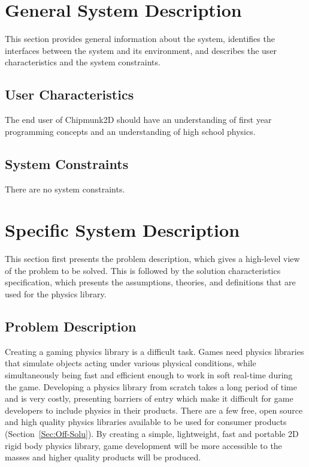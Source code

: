 \documentclass[12pt]{article}
\begin{document}
\section{General System Description}
\label{Sec:GeneSystDesc}
This section provides general information about the system, identifies the interfaces between the system and its environment, and describes the user characteristics and the system constraints.
\subsection{User Characteristics}
\label{Sec:UserChar}
The end user of Chipmunk2D should have an understanding of first year programming concepts and an understanding of high school physics.
\subsection{System Constraints}
\label{Sec:SystCons}
There are no system constraints.
\section{Specific System Description}
\label{Sec:SpecSystDesc}
This section first presents the problem description, which gives a high-level view of the problem to be solved. This is followed by the solution characteristics specification, which presents the assumptions, theories, and definitions that are used for the physics library.
\subsection{Problem Description}
\label{Sec:ProbDesc}
Creating a gaming physics library is a difficult task. Games need physics libraries that simulate objects acting under various physical conditions, while simultaneously being fast and efficient enough to work in soft real-time during the game. Developing a physics library from scratch takes a long period of time and is very costly, presenting barriers of entry which make it difficult for game developers to include physics in their products. There are a few free, open source and high quality physics libraries available to be used for consumer products (Section~\ref{Sec:Off-Solu}). By creating a simple, lightweight, fast and portable 2D rigid body physics library, game development will be more accessible to the masses and higher quality products will be produced.
\end{document}
